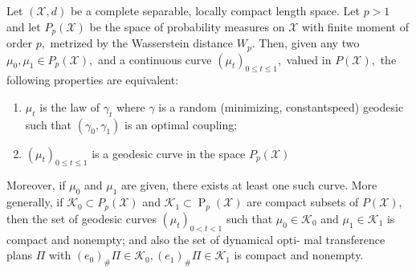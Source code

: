 \begin{thm}
	\label{geodesic_Wasserstein_space}
	Let \( ( \mathcal { X } , d ) \) be a complete separable, locally compact length space. Let \( p > 1 \) and let \( P _ { p } ( \mathcal { X } ) \) be the space of probability measures on \( \mathcal { X } \) with finite moment of order \( p , \) metrized by the Wasserstein distance \( W _ { p } . \) Then, given any two \( \mu _ { 0 } , \mu _ { 1 } \in P _ { p } ( \mathcal { X } ) , \) and a continuous curve \( \left( \mu _ { t } \right) _ { 0 \leq t \leq 1 } , \) valued in \( P ( \mathcal { X } ) , \) the following properties are equivalent:
	\begin{enumerate}
		\item \( \mu _ { t } \) is the law of \(\gamma _ { t } \) where \( \gamma \) is a random (minimizing, constantspeed) geodesic such that \( \left( \gamma _ { 0 } , \gamma _ { 1 } \right) \) is an optimal coupling;
		\item \( \left( \mu _ { t } \right) _ { 0 \leq t \leq 1 } \) is a geodesic curve in the space \( P _ { p } ( \mathcal { X } ) \)
	\end{enumerate}
	Moreover, if \( \mu _ { 0 } \) and \( \mu _ { 1 } \) are given, there exists at least one such curve.
	More generally, if \( \mathcal { K } _ { 0 } \subset P _ { p } ( \mathcal { X } ) \) and \( \mathcal { K } _ { 1 } \subset \operatorname { P } _ { p } ( \mathcal { X } ) \) are compact subsets of
	\( P ( \mathcal { X } ) , \) then the set of geodesic curves \( \left( \mu _ { t } \right) _ { 0 < t < 1 } \) such that \( \mu _ { 0 } \in \mathcal { K } _ { 0 } \) and
	\( \mu _ { 1 } \in \mathcal { K } _ { 1 } \) is compact and nonempty; and also the set of dynamical opti-
	mal transference plans \( \Pi \) with \( \left( e _ { 0 } \right) _ { \# } \Pi \in \mathcal { K } _ { 0 } , \left( e _ { 1 } \right) _ { \# } \Pi \in \mathcal { K } _ { 1 } \) is compact
	and nonempty.
\end{thm}
